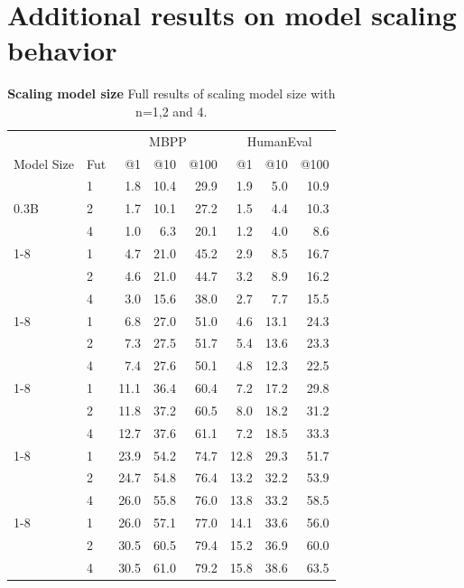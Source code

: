 \documentclass{article}
\theoremstyle{plain}
\theoremstyle{definition}
\theoremstyle{remark}
\begin{document}
\newpage
\section{Additional results on model scaling behavior}
\label{app:model-scaling}
\begin{table}[ht!]
    \centering
\caption{\textbf{Scaling model size} Full results of scaling model size with n=1,2 and 4.}
\label{tab:model_scaling}
\begin{tabular}{llrrrrrr}
\toprule
 &  & \multicolumn{3}{c}{MBPP} & \multicolumn{3}{c}{HumanEval} \\
Model Size & Fut & @1 & @10 & @100 & @1 & @10 & @100 \\
\midrule
\multirow[c]{3}{*}{0.3B} & 1 & 1.8 & 10.4 & 29.9 & 1.9 & 5.0 & 10.9 \\
 & 2 & 1.7 & 10.1 & 27.2 & 1.5 & 4.4 & 10.3 \\
 & 4 & 1.0 & 6.3 & 20.1 & 1.2 & 4.0 & 8.6 \\
\cmidrule{1-8}
\multirow[c]{3}{*}{0.6B} & 1 & 4.7 & 21.0 & 45.2 & 2.9 & 8.5 & 16.7 \\
 & 2 & 4.6 & 21.0 & 44.7 & 3.2 & 8.9 & 16.2 \\
 & 4 & 3.0 & 15.6 & 38.0 & 2.7 & 7.7 & 15.5 \\
\cmidrule{1-8}
\multirow[c]{3}{*}{1.3B} & 1 & 6.8 & 27.0 & 51.0 & 4.6 & 13.1 & 24.3 \\
 & 2 & 7.3 & 27.5 & 51.7 & 5.4 & 13.6 & 23.3 \\
 & 4 & 7.4 & 27.6 & 50.1 & 4.8 & 12.3 & 22.5 \\
\cmidrule{1-8}
\multirow[c]{3}{*}{3B} & 1 & 11.1 & 36.4 & 60.4 & 7.2 & 17.2 & 29.8 \\
 & 2 & 11.8 & 37.2 & 60.5 & 8.0 & 18.2 & 31.2 \\
 & 4 & 12.7 & 37.6 & 61.1 & 7.2 & 18.5 & 33.3 \\
\cmidrule{1-8}
\multirow[c]{3}{*}{6.7B} & 1 & 23.9 & 54.2 & 74.7 & 12.8 & 29.3 & 51.7 \\
 & 2 & 24.7 & 54.8 & 76.4 & 13.2 & 32.2 & 53.9 \\
 & 4 & 26.0 & 55.8 & 76.0 & 13.8 & 33.2 & 58.5 \\
\cmidrule{1-8}
\multirow[c]{3}{*}{13B} & 1 & 26.0 & 57.1 & 77.0 & 14.1 & 33.6 & 56.0 \\
 & 2 & 30.5 & 60.5 & 79.4 & 15.2 & 36.9 & 60.0 \\
 & 4 & 30.5 & 61.0 & 79.2 & 15.8 & 38.6 & 63.5 \\
\bottomrule
\end{tabular}
\end{table}
\end{document}
